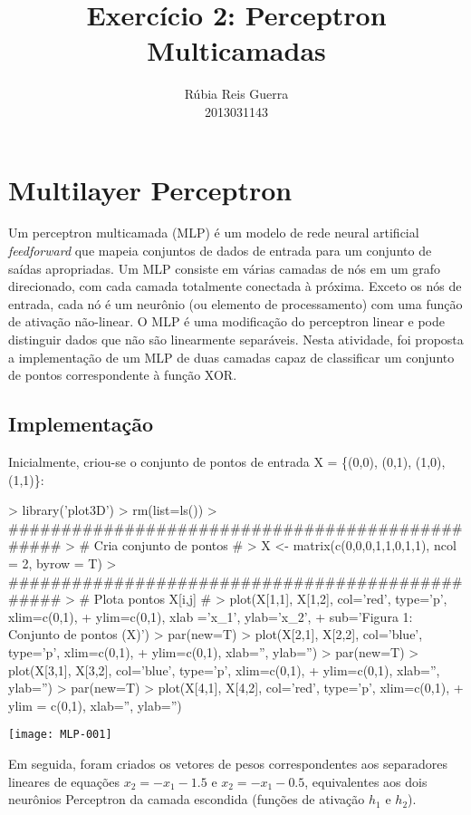 \documentclass{article}
\title{Exercício 2: Perceptron Multicamadas}
\author{Rúbia Reis Guerra \\ 2013031143}
\begin{document}


\maketitle

\section{Multilayer Perceptron}
Um perceptron multicamada (MLP) é um modelo de rede neural artificial \textit{feedforward} que mapeia conjuntos de dados de entrada para um conjunto de saídas apropriadas. Um MLP consiste em várias camadas de nós em um grafo direcionado, com cada camada totalmente conectada à próxima. Exceto os nós de entrada, cada nó é um neurônio (ou elemento de processamento) com uma função de ativação não-linear. O MLP é uma modificação do perceptron linear e pode distinguir dados que não são linearmente separáveis. 
Nesta atividade, foi proposta a implementação de um MLP de duas camadas capaz de classificar um conjunto de pontos correspondente à função XOR.

\subsection{Implementação}
Inicialmente, criou-se o conjunto de pontos de entrada X = \{(0,0), (0,1), (1,0), (1,1)\}:

\begin{Schunk}
\begin{Sinput}
> library('plot3D')
> rm(list=ls())
> ################################################
> # Cria conjunto de pontos #
> X <- matrix(c(0,0,0,1,1,0,1,1), ncol = 2, byrow = T)
> ################################################
> # Plota pontos X[i,j] #
> plot(X[1,1], X[1,2], col='red', type='p', xlim=c(0,1),
+      ylim=c(0,1), xlab ='x_1', ylab='x_2',
+      sub='Figura 1: Conjunto de pontos (X)')
> par(new=T)
> plot(X[2,1], X[2,2], col='blue', type='p', xlim=c(0,1),
+      ylim=c(0,1), xlab='', ylab='')
> par(new=T)
> plot(X[3,1], X[3,2], col='blue', type='p', xlim=c(0,1),
+      ylim=c(0,1), xlab='', ylab='')
> par(new=T)
> plot(X[4,1], X[4,2], col='red', type='p', xlim=c(0,1),
+      ylim = c(0,1), xlab='', ylab='')
\end{Sinput}
\end{Schunk}
\texttt{[image: MLP-001]}

Em seguida, foram criados os vetores de pesos correspondentes aos separadores lineares de equações $x_{2} = -x_{1} - 1.5$ e $x_{2} = -x_{1} - 0.5$, equivalentes aos dois neurônios Perceptron da camada escondida (funções de ativação $h_{1}$ e $h_{2}$).
\end{document}
